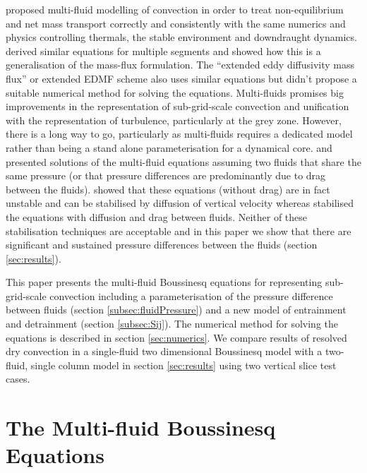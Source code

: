 \documentclass[draft]{agujournal2019}
\begin{document}
 proposed multi-fluid modelling of convection in order
to treat non-equilibrium and net mass transport correctly and consistently
with the same numerics and physics controlling thermals, the stable
environment and downdraught dynamics.  derived similar
equations for multiple segments and showed how this is a generalisation
of the mass-flux formulation. The  ``extended eddy
diffusivity mass flux'' or extended EDMF scheme also uses similar
equations but  didn't propose a suitable numerical
method for solving the equations. Multi-fluids promises big improvements
in the representation of sub-grid-scale convection and unification
with the representation of turbulence, particularly at the grey zone.
However, there is a long way to go, particularly as multi-fluids requires
a dedicated model rather than being a stand alone parameterisation
for a dynamical core.  and  presented solutions
of the multi-fluid equations assuming two fluids that share the same
pressure (or that pressure differences are predominantly due to drag
between the fluids).  showed that these equations (without
drag) are in fact unstable and can be stabilised by diffusion of vertical
velocity whereas  stabilised the equations with diffusion
and drag between fluids. Neither of these stabilisation techniques
are acceptable and in this paper we show that there are significant
and sustained pressure differences between the fluids (section \ref{sec:results}). 

This paper presents the multi-fluid Boussinesq equations for representing
sub-grid-scale convection including a parameterisation of the pressure
difference between fluids (section \ref{subsec:fluidPressure}) and
a new model of entrainment and detrainment (section \ref{subsec:Sij}).
The numerical method for solving the equations is described in section
\ref{sec:numerics}. We compare results of resolved dry convection
in a single-fluid two dimensional Boussinesq model with a two-fluid,
single column model in section \ref{sec:results} using two vertical
slice test cases.

\section{The Multi-fluid Boussinesq Equations}
\end{document}
